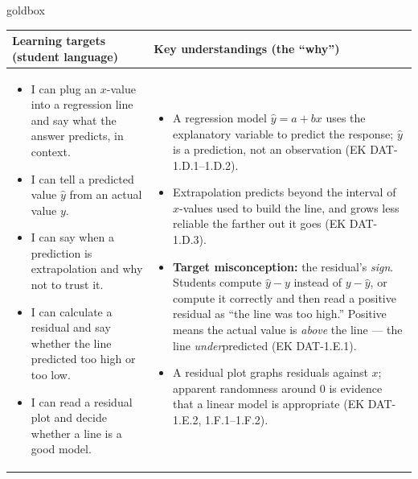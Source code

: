 \documentclass[10pt]{article}
\begin{document}
\renewcommand{\arraystretch}{1.4}
\boxguard
\begin{skillbox}{goldbox}
\begin{tabularx}{\linewidth}{@{}X|X@{}}
\textbf{Learning targets (student language)} & \textbf{Key understandings (the ``why'')} \\[2pt]
\hline
\vspace{-6pt}
\begin{itemize}[leftmargin=1.1em, nosep, after=\vspace{2pt}]
  \item I can plug an $x$-value into a regression line and say what the answer predicts, in
        context.
  \item I can tell a predicted value $\hat{y}$ from an actual value $y$.
  \item I can say when a prediction is extrapolation and why not to trust it.
  \item I can calculate a residual and say whether the line predicted too high or too low.
  \item I can read a residual plot and decide whether a line is a good model.
\end{itemize}
&
\vspace{-6pt}
\begin{itemize}[leftmargin=1.1em, nosep, after=\vspace{2pt}]
  \item A regression model $\hat{y} = a + bx$ uses the explanatory variable to predict the
        response; $\hat{y}$ is a prediction, not an observation (EK DAT-1.D.1--1.D.2).
  \item Extrapolation predicts beyond the interval of $x$-values used to build the line, and
        grows less reliable the farther out it goes (EK DAT-1.D.3).
  \item \textbf{Target misconception:} the residual's \emph{sign}. Students compute
        $\hat{y} - y$ instead of $y - \hat{y}$, or compute it correctly and then read a
        positive residual as ``the line was too high.'' Positive means the actual value is
        \emph{above} the line --- the line \emph{under}predicted (EK DAT-1.E.1).
  \item A residual plot graphs residuals against $x$; apparent randomness around 0 is
        evidence that a linear model is appropriate (EK DAT-1.E.2, 1.F.1--1.F.2).
\end{itemize}
\end{tabularx}
\end{skillbox}
\end{document}
